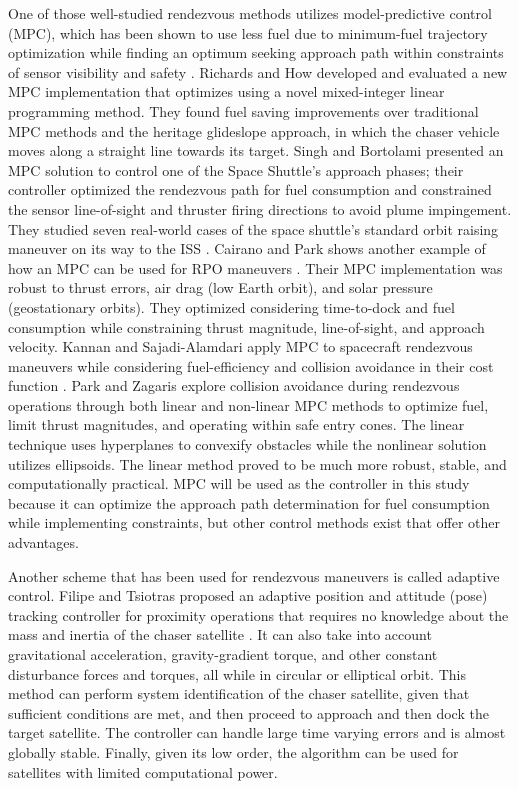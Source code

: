 \documentclass[letterpaper, preprint, paper,11pt]{AAS}	%
\begin{document}
One of those well-studied rendezvous methods utilizes model-predictive control (MPC), which has been shown to use less fuel due to minimum-fuel trajectory optimization while finding an optimum seeking approach path within constraints of sensor visibility and safety \cite{RichardsHow_PerformanceMPC}. Richards and How developed and evaluated a new MPC implementation that optimizes using a novel mixed-integer linear programming method. They found fuel saving improvements over traditional MPC methods and the heritage glideslope approach, in which the chaser vehicle
moves along a straight line towards its target. Singh and Bortolami presented an MPC solution to control one of the Space Shuttle's approach phases; their controller optimized the rendezvous path for fuel consumption and constrained the sensor line-of-sight and thruster firing directions to avoid plume impingement. They studied seven real-world cases of the space shuttle's standard orbit raising maneuver on its way to the ISS \cite{SinghBortolami_OptimalMPC}. Cairano and Park shows another example of how an MPC can be used for RPO maneuvers \cite{CairanoPark_MPCRPO}. Their MPC implementation was robust to thrust errors, air drag (low Earth orbit), and solar pressure (geostationary orbits). They optimized considering time-to-dock and fuel consumption while constraining thrust magnitude, line-of-sight, and approach velocity. Kannan and Sajadi-Alamdari apply MPC to spacecraft rendezvous maneuvers while considering fuel-efficiency and collision avoidance in their cost function \cite{KannanAlamdari_MPC}. Park and Zagaris explore collision avoidance during rendezvous operations through both linear and non-linear MPC methods to optimize fuel, limit thrust magnitudes, and operating within safe entry cones\cite{ParkZagaris_AnalysisMPC}. The linear technique uses hyperplanes to convexify obstacles while the nonlinear solution utilizes ellipsoids. The linear method proved to be much more robust, stable, and computationally practical. MPC will be used as the controller in this study because it can optimize the approach path determination for fuel consumption while implementing constraints, but other control methods exist that offer other advantages.

Another scheme that has been used for rendezvous maneuvers is called adaptive control. Filipe and Tsiotras proposed an adaptive position and attitude (pose) tracking controller for proximity operations that requires no knowledge about the mass and inertia of the chaser satellite \cite{FilipeTsiotras_AdaptiveDualQ}. It can also take into account gravitational acceleration, gravity-gradient torque, and other constant disturbance forces and torques, all while in circular or elliptical orbit. This method can perform system identification of the chaser satellite, given that sufficient conditions are met, and then proceed to approach and then dock the target satellite. The controller can handle large time varying errors and is almost globally stable. Finally, given its low order, the algorithm can be used for satellites with limited computational power.
\end{document}
